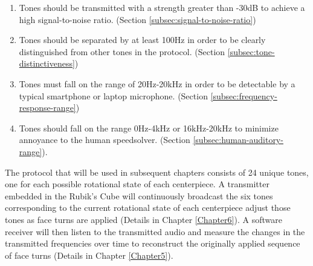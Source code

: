\begin{enumerate}

    \item Tones should be transmitted with a strength greater than
    -30dB to achieve a high signal-to-noise ratio. (Section
    \ref{subsec:signal-to-noise-ratio})
    
    \item Tones should be separated by at least 100Hz in order to be
    clearly distinguished from other tones in the protocol. (Section
    \ref{subsec:tone-distinctiveness})
    
    \item Tones must fall on the range of 20Hz-20kHz in order to be
    detectable by a typical smartphone or laptop microphone. (Section
    \ref{subsec:frequency-response-range})
    
    \item Tones should fall on the range 0Hz-4kHz or 16kHz-20kHz to
    minimize annoyance to the human speedsolver. (Section
    \ref{subsec:human-auditory-range}).

\end{enumerate}

The protocol that will be used in subsequent chapters consists of 24
unique tones, one for each possible rotational state of each
centerpiece. A transmitter embedded in the Rubik's Cube will
continuously broadcast the six tones corresponding to the current
rotational state of each centerpiece adjust those tones as face turns
are applied (Details in Chapter \ref{Chapter6}). A software receiver
will then listen to the transmitted audio and measure the changes in
the transmitted frequencies over time to reconstruct the originally
applied sequence of face turns (Details in Chapter \ref{Chapter5}).
